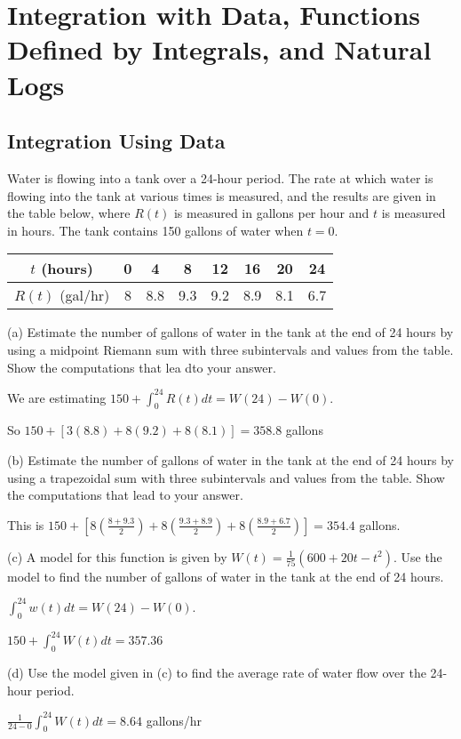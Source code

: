\documentclass[../bccalc.tex]{subfiles}
\begin{document}
\chapter{Integration with Data, Functions Defined by Integrals, and Natural Logs}
\section{Integration Using Data}
\begin{example}
    Water is flowing into a tank over a 24-hour period. The rate at which water is flowing into the tank at various times is measured, and the results are given in the table below, where $R(t)$ is measured in gallons per hour and $t$ is measured in hours. The tank contains 150 gallons of water when $t=0$.
    \begin{center}
        \begin{tabular}{|c|c|c|c|c|c|c|c|}
            \hline
            $t$ (hours) & 0 & 4 & 8 & 12 & 16 & 20 & 24 \\ \hline 
            $R(t)$ (gal/hr) & 8 & 8.8 & 9.3 & 9.2 & 8.9 & 8.1 & 6.7 \\ \hline
        \end{tabular}
    \end{center}
    (a) Estimate the number of gallons of water in the tank at the end of 24 hours by using a midpoint Riemann sum with three subintervals and values from the table. Show the computations that lea dto your answer.

    We are estimating $150+\int_0^{24} R(t)dt=W(24)-W(0)$.

    So $150+[3(8.8)+8(9.2)+8(8.1)]=358.8$ gallons

    (b) Estimate the number of gallons of water in the tank at the end of 24 hours by using a trapezoidal sum with three subintervals and values from the table. Show the computations that lead to your answer.

    This is $150+\left[8\left(\frac{8+9.3}{2}\right)+8\left(\frac{9.3+8.9}{2}\right)+8\left(\frac{8.9+6.7}{2}\right) \right] = 354.4$ gallons.

    (c) A model for this function is given by $W(t)=\frac{1}{75}(600+20t-t^2)$. Use the model to find the number of gallons of water in the tank at the end of 24 hours.

    $\int_0^{24}w(t)dt=W(24)-W(0)$.

    $150+\int_0^{24}W(t)dt = 357.36$

    (d) Use the model given in (c) to find the average rate of water flow over the 24-hour period.

    $\frac{1}{24-0}\int_0^{24}W(t)dt = 8.64$ gallons/hr
\end{example}
\end{document}
